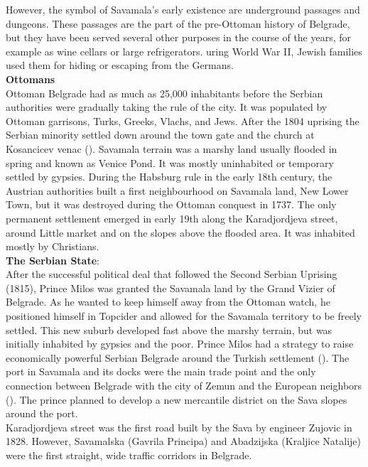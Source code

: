 \documentclass[11pt]{report}
\begin{document}
However, the symbol of Savamala's early existence are underground passages and dungeons. These passages are the part of the pre-Ottoman history of Belgrade, but they have been served several other purposes in the course of the years, for example as wine cellars or large refrigerators. 
uring World War II, Jewish families used them for hiding or escaping from the Germans.
\\
\textbf{Ottomans}
\\
Ottoman Belgrade had as much as 25,000 inhabitants before the Serbian authorities were gradually taking the rule of the city.
It was populated by Ottoman garrisons, Turks, Greeks, Vlachs, and Jews.
After the 1804 uprising the Serbian minority settled down around the town gate and the church at Kosancicev venac (\href{}{\citealt{doytchinov_modernization_2015}}).
Savamala terrain was a marshy land usually flooded in spring and known as Venice Pond.
It was mostly uninhabited or temporary settled by gypsies.
During the Habsburg rule in the early 18th century, the Austrian authorities built a first neighbourhood on Savamala land, New Lower Town, but it was destroyed during the Ottoman conquest in 1737. The only permanent settlement emerged in early 19th along the Karadjordjeva street, around Little market and on the slopes above the flooded area. It was inhabited mostly by Christians.
\\
\textbf{The Serbian State}:
\\
After the successful political deal that followed the Second Serbian Uprising (1815), Prince Milos was granted the Savamala land by the Grand Vizier of Belgrade.
As he wanted to keep himself away from the Ottoman watch, he positioned himself in Topcider and allowed for the Savamala territory to be freely settled.
This new suburb developed fast above the marshy terrain, but was initially inhabited by gypsies and the poor.
Prince Milos had a strategy to raise economically powerful Serbian Belgrade around the Turkish settlement (\cite{bureau savamala}).
The port in Savamala and its docks were the main trade point and the only connection between Belgrade with the city of Zemun and the European neighbors (\href{}{\citealt{doytchinov_modernization_2015}}).
The prince planned to develop a new mercantile district on the Sava slopes around the port. 
\\
Karadjordjeva street was the first road built by the Sava by engineer Zujovic in 1828.
However, Savamalska (Gavrila Principa) and Abadzijska (Kraljice Natalije) were the first straight, wide traffic corridors in Belgrade.
\end{document}
